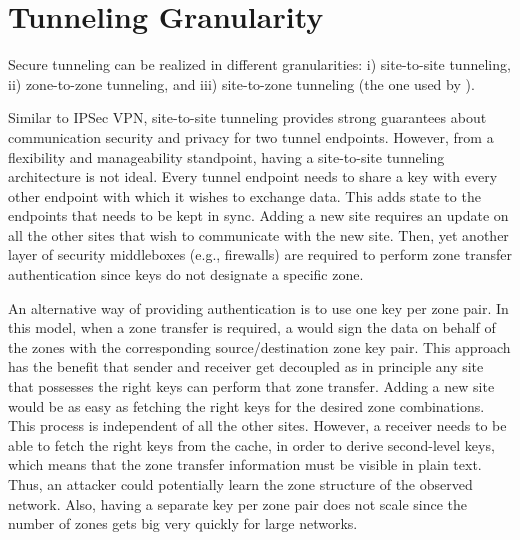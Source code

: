 \section{Tunneling Granularity} %
\label{sec:granularity}
Secure tunneling can be realized in different granularities: i) site-to-site tunneling,
ii) zone-to-zone tunneling, and iii) site-to-zone tunneling (the one used by \name).

Similar to IPSec VPN, site-to-site tunneling provides strong guarantees about
communication security and privacy for two tunnel endpoints. However, from a
flexibility and manageability standpoint, having a site-to-site tunneling
architecture is not ideal. Every tunnel endpoint needs to share a key with every
other endpoint with which it wishes to exchange data. This adds state to the
endpoints that needs to be kept in sync. Adding a new site requires an update on
all the other sites that wish to communicate with the new site. Then, yet
another layer of security middleboxes (e.g., firewalls) are required to perform
zone transfer authentication since keys do not designate a specific zone.

An alternative way of providing authentication is to use one key per zone pair.
In this model, when a zone transfer is required, a \tp would sign the data on
behalf of the zones with the corresponding source/destination zone key pair.
This approach has the benefit that sender and receiver get decoupled as in
principle any site that possesses the right keys can perform that zone transfer.
Adding a new site would be as easy as fetching the right keys for the desired
zone combinations. This process is independent of all the other sites. However,
a receiver \tp needs to be able to fetch the right keys from the cache, in order
to derive second-level keys, which means that the zone transfer information must
be visible in plain text. Thus, an attacker could potentially learn the zone
structure of the observed network. Also, having a separate key per zone pair
does not scale since the number of zones gets big very quickly for large
networks.

